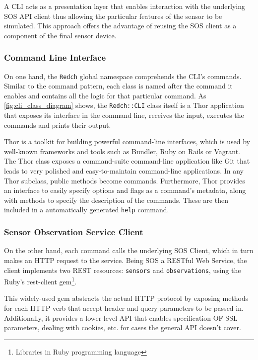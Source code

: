 A CLI acts as a presentation layer that enables interaction with the underlying SOS API client thus allowing the particular features of the sensor to be simulated. This approach offers the advantage of reusing the SOS client as a component of the final sensor device.

\subsubsection*{Command Line Interface}

On one hand, the \texttt{Redch} global namespace comprehends the CLI's commands. Similar to the command pattern, each class is named after the command it enables and contains all the logic for that particular command. As \ref{fig:cli_class_diagram} shows, the \texttt{Redch::CLI} class itself is a Thor application that exposes its interface in the command line, receives the input, executes the commands and prints their output.

Thor is a toolkit for building powerful command-line interfaces, which is used by well-known frameworks and tools such as Bundler, Ruby on Rails or Vagrant. The Thor class exposes a command-suite command-line application like Git that leads to very polished and easy-to-maintain command-line applications. In any Thor subclass, public methods become commands. Furthermore, Thor provides an interface to easily specify options and flags as a command's metadata, along with methods to specify the description of the commands. These are then included in a automatically generated \texttt{help} command.

\subsubsection*{Sensor Observation Service Client}

On the other hand, each command calls the underlying SOS Client, which in turn makes an HTTP request to the service. Being SOS a RESTful Web Service, the client implements two REST resources: \texttt{sensors} and \texttt{observations}, using the Ruby's rest-client gem\footnote{Libraries in Ruby programming language}.

This widely-used gem abstracts the actual HTTP protocol by exposing methods for each HTTP verb that accept header and query parameters to be passed in. Additionally, it provides a lower-level API that enables specification OF SSL parameters, dealing with cookies, etc. for cases the general API doesn't cover.

